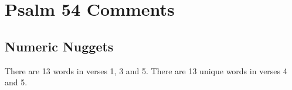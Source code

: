 \section{Psalm 54 Comments}

\subsection{Numeric Nuggets}
There are 13 words in verses 1, 3 and 5. There are 13 unique words in verses 4 and 5.